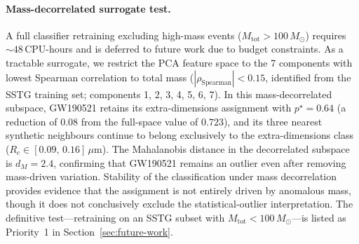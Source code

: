 \paragraph{Mass-decorrelated surrogate test.}
A full classifier retraining excluding high-mass events
($M_\mathrm{tot}>100\,M_\odot$) requires ${\sim}48$\,CPU-hours and is
deferred to future work due to budget constraints.  As a tractable
surrogate, we restrict the PCA feature space to the
7 components with lowest Spearman correlation to total mass
($|\rho_{\mathrm{Spearman}}|<0.15$, identified from the
SSTG training set; components
{1, 2, 3, 4, 5, 6, 7}).
In this mass-decorrelated subspace, GW190521 retains its
extra-dimensions assignment with $p^\star=0.64$ (a reduction
of $0.08$ from the full-space value of
$0.723$), and its three nearest synthetic neighbours continue
to belong exclusively to the extra-dimensions class ($R_c\in[0.09,\,0.16]\,\mu$m).
The Mahalanobis distance in the decorrelated subspace is $d_M=2.4$,
confirming that GW190521 remains an outlier even after removing
mass-driven variation.  Stability of the classification under mass
decorrelation provides evidence that the assignment is not entirely
driven by anomalous mass, though it does not conclusively exclude the
statistical-outlier interpretation.  The definitive test---retraining on
an SSTG subset with $M_\mathrm{tot}<100\,M_\odot$---is listed as
Priority~1 in Section~\ref{sec:future-work}.
